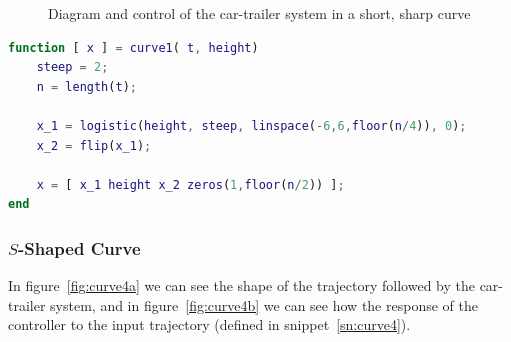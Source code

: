 \begin{figure}[H]
	\centering
	\hspace{0.5cm}%
	\caption{Diagram and control of the car-trailer system in a short, sharp curve}
\end{figure}

\begin{lstlisting}[language=matlab, label=sn:curve3b, caption=Function used to simulate a short sharp curve]
function [ x ] = curve1( t, height)
	steep = 2;
	n = length(t);

	x_1 = logistic(height, steep, linspace(-6,6,floor(n/4)), 0);
	x_2 = flip(x_1);

	x = [ x_1 height x_2 zeros(1,floor(n/2)) ];
end
\end{lstlisting}

\subsubsection*{$S$-Shaped Curve}
In figure~\ref{fig:curve4a} we can see the shape of the trajectory followed by the car-trailer system, and in figure~\ref{fig:curve4b} we can see how the response of the controller to the input trajectory (defined in snippet~\ref{sn:curve4}).

